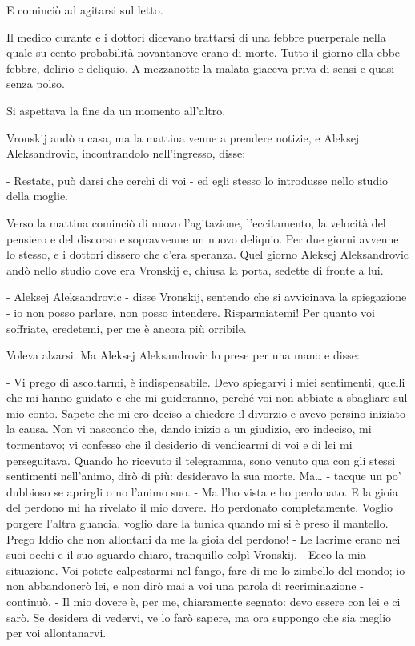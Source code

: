 E cominciò ad agitarsi sul letto. 

Il medico curante e i dottori dicevano trattarsi di una febbre puerperale nella quale su cento probabilità novantanove erano di morte. Tutto il giorno ella ebbe febbre, delirio e deliquio. A mezzanotte la malata giaceva priva di sensi e quasi senza polso. 

Si aspettava la fine da un momento all'altro. 

Vronskij andò a casa, ma la mattina venne a prendere notizie, e Aleksej Aleksandrovic, incontrandolo nell'ingresso, disse: 

- Restate, può darsi che cerchi di voi - ed egli stesso lo introdusse nello studio della moglie. 

Verso la mattina cominciò di nuovo l'agitazione, l'eccitamento, la velocità del pensiero e del discorso e sopravvenne un nuovo deliquio. Per due giorni avvenne lo stesso, e i dottori dissero che c'era speranza. Quel giorno Aleksej Aleksandrovic andò nello studio dove era Vronskij e, chiusa la porta, sedette di fronte a lui. 

- Aleksej Aleksandrovic - disse Vronskij, sentendo che si avvicinava la spiegazione - io non posso parlare, non posso intendere. Risparmiatemi! Per quanto voi soffriate, credetemi, per me è ancora più orribile. 

Voleva alzarsi. Ma Aleksej Aleksandrovic lo prese per una mano e disse: 

- Vi prego di ascoltarmi, è indispensabile. Devo spiegarvi i miei sentimenti, quelli che mi hanno guidato e che mi guideranno, perché voi non abbiate a sbagliare sul mio conto. Sapete che mi ero deciso a chiedere il divorzio e avevo persino iniziato la causa. Non vi nascondo che, dando inizio a un giudizio, ero indeciso, mi tormentavo; vi confesso che il desiderio di vendicarmi di voi e di lei mi perseguitava. Quando ho ricevuto il telegramma, sono venuto qua con gli stessi sentimenti nell'animo, dirò di più: desideravo la sua morte. Ma\ldots{} - tacque un po' dubbioso se aprirgli o no l'animo suo. - Ma l'ho vista e ho perdonato. E la gioia del perdono mi ha rivelato il mio dovere. Ho perdonato completamente. Voglio porgere l'altra guancia, voglio dare la tunica quando mi si è preso il mantello. Prego Iddio che non allontani da me la gioia del perdono! - Le lacrime erano nei suoi occhi e il suo sguardo chiaro, tranquillo colpì Vronskij. - Ecco la mia situazione. Voi potete calpestarmi nel fango, fare di me lo zimbello del mondo; io non abbandonerò lei, e non dirò mai a voi una parola di recriminazione - continuò. - Il mio dovere è, per me, chiaramente segnato: devo essere con lei e ci sarò. Se desidera di vedervi, ve lo farò sapere, ma ora suppongo che sia meglio per voi allontanarvi. 

